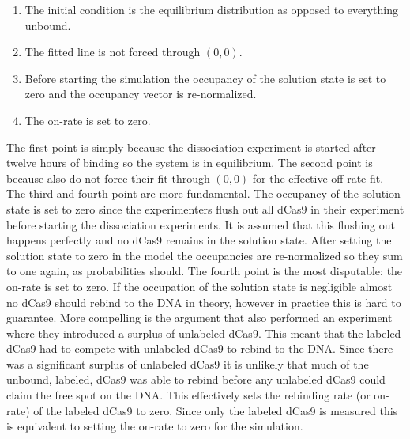 \begin{enumerate}
\item The initial condition is the equilibrium distribution as opposed to everything unbound.
\item The fitted line is not forced through $(0,0)$.
\item Before starting the simulation the occupancy of the solution state is set to zero and the occupancy vector is re-normalized.
\item The on-rate is set to zero.
\end{enumerate}

The first point is simply because the dissociation experiment is started after twelve hours of binding so the system is in equilibrium. The second point is because \cite{PNAS} also do not force their fit through $(0,0)$ for the effective off-rate fit. The third and fourth point are more fundamental. The occupancy of the solution state is set to zero since the experimenters flush out all dCas9 in their experiment before starting the dissociation experiments. It is assumed that this flushing out happens perfectly and no dCas9 remains in the solution state. After setting the solution state to zero in the model the occupancies are re-normalized so they sum to one again, as probabilities should. The fourth point is the most disputable: the on-rate is set to zero. If the occupation of the solution state is negligible almost no dCas9 should rebind to the DNA in theory, however in practice this is hard to guarantee. More compelling is the argument that \cite{PNAS} also performed an experiment where they introduced a surplus of unlabeled dCas9. This meant that the labeled dCas9 had to compete with unlabeled dCas9 to rebind to the DNA. Since there was a significant surplus of unlabeled dCas9 it is unlikely that much of the unbound, labeled, dCas9 was able to rebind before any unlabeled dCas9 could claim the free spot on the DNA. This effectively sets the rebinding rate (or on-rate) of the labeled dCas9 to zero. Since only the labeled dCas9 is measured this is equivalent to setting the on-rate to zero for the simulation.

